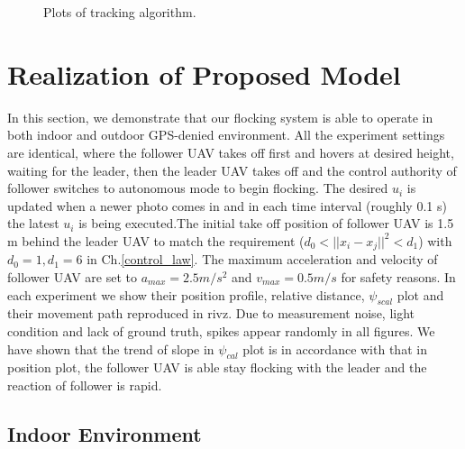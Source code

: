 \begin{figure}[H]
  \caption{Plots of tracking algorithm.}\label{fig:track_plot}
\end{figure}

\section{Realization of Proposed Model}

In this section, we demonstrate that our flocking system is able to operate in both indoor and outdoor GPS-denied environment. All the experiment settings are identical, where the follower UAV takes off first and hovers at desired height, waiting for the leader, then the leader UAV takes off and the control authority of follower switches to autonomous mode to begin flocking. The desired $u_i$ is updated when a newer photo comes in and in each time interval (roughly 0.1 s) the latest $u_i$ is being executed.The initial take off position of follower UAV is 1.5 m behind the leader UAV to match the requirement ($d_0<||x_i-x_j||^2<d_1$) with $d_0=1, d_1=6$ in Ch.\ref{control_law}. The maximum acceleration and velocity of follower UAV are set to $a_{max}=2.5 m/s^2$ and $v_{max}=0.5 m/s$ for safety reasons. In each experiment we show their position profile, relative distance, $\psi_{scal}$ plot and their movement path reproduced in rivz. Due to measurement noise, light condition and lack of ground truth, spikes appear randomly in all figures. We have shown that the trend of slope in $\psi_{cal}$ plot is in accordance with that in position plot, the follower UAV is able stay flocking with the leader and the reaction of follower is rapid.

\subsection{Indoor Environment}

